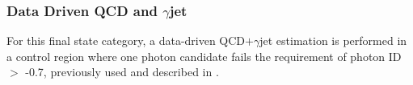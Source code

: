 \subsubsection{Data Driven QCD and $\gamma$jet}
\label{subsubsec:QCDDataDriven}

For this final state category, a data-driven QCD$+\gamma$jet estimation is performed in a control region where one photon candidate fails the requirement of photon ID $>$ -0.7, previously used and described in \cite{Sirunyan:2020sum}.







